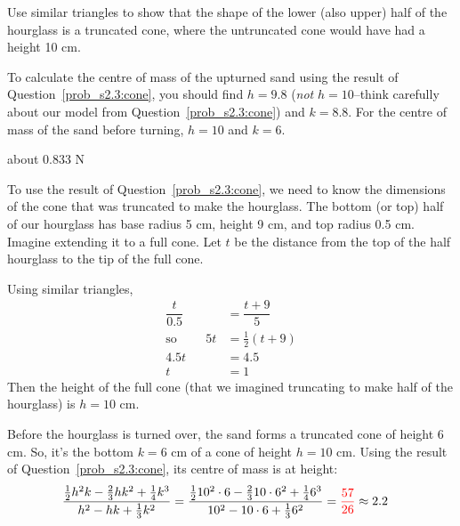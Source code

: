 \begin{hint}
Use similar triangles to show that the shape of the lower (also upper) half of the hourglass is a truncated cone, where the untruncated cone would have had a height 10 cm.

To calculate the centre of mass of the upturned sand using the result of Question~\ref{prob_s2.3:cone}, you should find $h=9.8$ (\emph{not} $h=10$--think carefully about our model from Question~\ref{prob_s2.3:cone}) and $k=8.8$. For the centre of mass of the sand before turning, $h=10$ and $k=6$.
\end{hint}
\begin{answer}
about 0.833 N
\end{answer}
\begin{solution}
To use the result of Question~\ref{prob_s2.3:cone}, we need to know the dimensions of the cone that was truncated to make the hourglass. The bottom (or top) half of our hourglass has base radius 5 cm,  height 9 cm, and top radius 0.5 cm. Imagine extending it to a full cone. Let $t$ be the distance from the top of the half hourglass to the tip of the full cone.
\begin{center}
\end{center}
Using similar triangles, \begin{align*}\dfrac{t}{0.5} &= \dfrac{t+9}{5}\\
\text{so }\qquad 5t&=\frac{1}{2}(t+9)\\
4.5t&=4.5\\
t&=1
\end{align*}
Then the height of the full cone (that we imagined truncating to make half of the hourglass) is $h=10$ cm.

Before the hourglass is turned over, the sand forms a truncated cone of height $6$ cm. So, it's the bottom $k=6$ cm of a cone of height $h=10$ cm. Using the result of Question~\ref{prob_s2.3:cone}, its centre of mass is at height:
\begin{align*}
\frac{\frac{1}{2}h^2k - \frac{2}{3}hk^2+\frac{1}{4}k^3}{h^2-hk+\frac{1}{3}k^2}&=
\frac{\frac{1}{2}10^2\cdot 6 - \frac{2}{3}10\cdot 6^2+\frac{1}{4}6^3}{10^2-10\cdot 6+\frac{1}{3}6^2}=\textcolor{red}{\frac{57}{26}}\approx2.2
\end{align*}


\end{solution}
